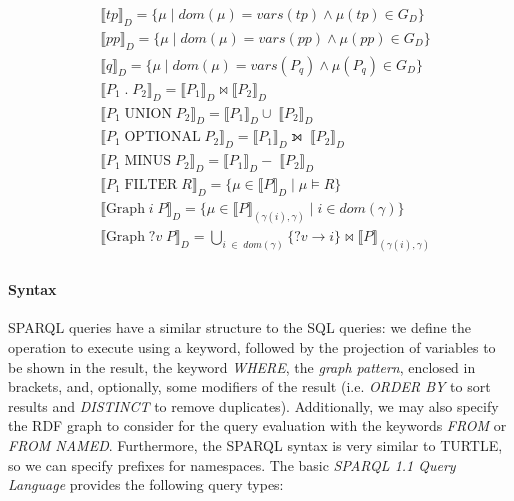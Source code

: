 \begin{definition}
\begin{equation}
    \begin{split} 
    & \llbracket tp \rrbracket_D = \{ \mu \;\vert\; dom(\mu) = vars(tp) \wedge \mu(tp) \in G_D \}\\
    & \llbracket pp \rrbracket_D = \{ \mu \;\vert\; dom(\mu) = vars(pp) \wedge \mu(pp) \in G_D \}\\
    & \llbracket q \rrbracket_D = \{ \mu \;\vert\; dom(\mu) = vars(P_q) \wedge \mu(P_q) \in G_D \}\\
    & \llbracket P_1 \;.\; P_2 \rrbracket_D = \llbracket P_1 \rrbracket_D \Join \llbracket P_2 \rrbracket_D \\
    & \llbracket P_1 \;\textrm{UNION}\; P_2 \rrbracket_D = \llbracket P_1 \rrbracket_D \cup \;\llbracket P_2 \rrbracket_D \\
    & \llbracket P_1 \;\textrm{OPTIONAL}\; P_2 \rrbracket_D = \llbracket P_1 \rrbracket_D \leftouterjoin \; \llbracket P_2 \rrbracket_D \\
    & \llbracket P_1 \;\textrm{MINUS}\; P_2 \rrbracket_D = \llbracket P_1 \rrbracket_D - \; \llbracket P_2 \rrbracket_D \\
    & \llbracket P_1 \;\textrm{FILTER}\; R \rrbracket_D = \{ \mu \in \llbracket P \rrbracket_D \;\vert\; \mu \vDash R \} \\
    & \llbracket \textrm{Graph} \;i\; P\rrbracket_D = \{ \mu \in \llbracket P \rrbracket_{(\gamma(i), \gamma)} \;\vert\; i \in dom(\gamma) \}\\
    & \llbracket \textrm{Graph} \;?v\; P\rrbracket_D = \bigcup_{i \; \in \; dom(\gamma)} \{ ?v \to i \} \Join \llbracket P \rrbracket_{(\gamma(i), \gamma)} \\
    \end{split}
\end{equation}
\end{definition}

\paragraph{Syntax} \gls{SPARQL} queries have a similar structure to the \gls{SQL} queries: we define the operation to execute using a keyword, followed by the projection of variables to be shown in the result, the keyword \emph{WHERE}, the \emph{graph pattern}, enclosed in brackets, and, optionally, some modifiers of the result (i.e. \emph{ORDER BY} to sort results and \emph{DISTINCT} to remove duplicates). Additionally, we may also specify the \gls{RDF} graph to consider for the query evaluation with the keywords \emph{FROM} or \emph{FROM NAMED}. Furthermore, the \gls{SPARQL} syntax is very similar to \gls{TURTLE}, so we can specify prefixes for namespaces. 
The basic \emph{\gls{SPARQL} 1.1 Query Language} \autocite{W3c2008-vf} provides the following query types: 

